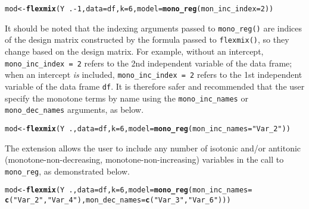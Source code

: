 \documentclass[10pt]{olplainarticle}\usepackage[]{graphicx}\usepackage[]{color}
\makeatletter
\newcommand{\hlnum}[1]{\textcolor[rgb]{0.686,0.059,0.569}{#1}}%
\newcommand{\hlstr}[1]{\textcolor[rgb]{0.192,0.494,0.8}{#1}}%
\newcommand{\hlopt}[1]{\textcolor[rgb]{0,0,0}{#1}}%
\newcommand{\hlstd}[1]{\textcolor[rgb]{0.345,0.345,0.345}{#1}}%
\newcommand{\hlkwb}[1]{\textcolor[rgb]{0.69,0.353,0.396}{#1}}%
\newcommand{\hlkwc}[1]{\textcolor[rgb]{0.333,0.667,0.333}{#1}}%
\newcommand{\hlkwd}[1]{\textcolor[rgb]{0.737,0.353,0.396}{\textbf{#1}}}%
\newenvironment{kframe}{%
 \def\at@end@of@kframe{}%
 \ifinner\ifhmode%
  \def\at@end@of@kframe{\end{minipage}}%
  \begin{minipage}{\columnwidth}%
 \fi\fi%
 \def\FrameCommand##1{\hskip\@totalleftmargin \hskip-\fboxsep
 \colorbox{shadecolor}{##1}\hskip-\fboxsep
     \hskip-\linewidth \hskip-\@totalleftmargin \hskip\columnwidth}%
 \MakeFramed {\advance\hsize-\width
   \@totalleftmargin\z@ \linewidth\hsize
   \@setminipage}}%
 {\par\unskip\endMakeFramed%
 \at@end@of@kframe}
\newenvironment{knitrout}{}{} %
\makeatother
\begin{document}
\begin{appendices}
\begin{knitrout}
\color{fgcolor}\begin{kframe}
\begin{alltt}
\hlstd{mod} \hlkwb{<-} \hlkwd{flexmix}\hlstd{(Y} \hlopt{~} \hlstd{.}\hlopt{-}\hlnum{1}\hlstd{,} \hlkwc{data} \hlstd{= df,} \hlkwc{k} \hlstd{=} \hlnum{6}\hlstd{,} \hlkwc{model} \hlstd{=} \hlkwd{mono_reg}\hlstd{(}\hlkwc{mon_inc_index} \hlstd{=} \hlnum{2}\hlstd{))}
\end{alltt}
\end{kframe}
\end{knitrout}

It should be noted that the indexing arguments passed to \texttt{mono\_reg()} are indices of the design matrix constructed by the formula passed to \texttt{flexmix()}, so they change based on the design matrix. For example, without an intercept, \texttt{mono\_inc\_index = 2} refers to the 2nd independent variable of the data frame; when an intercept \emph{is} included, \texttt{mono\_inc\_index = 2} refers to the 1st independent variable of the data frame \texttt{df}. It is therefore safer and recommended that the user specify the monotone terms by name using the \texttt{mono\_inc\_names} or \texttt{mono\_dec\_names} arguments, as below.

\begin{knitrout}
\color{fgcolor}\begin{kframe}
\begin{alltt}
\hlstd{mod} \hlkwb{<-} \hlkwd{flexmix}\hlstd{(Y} \hlopt{~} \hlstd{.,} \hlkwc{data} \hlstd{= df,} \hlkwc{k} \hlstd{=} \hlnum{6}\hlstd{,} \hlkwc{model} \hlstd{=} \hlkwd{mono_reg}\hlstd{(}\hlkwc{mon_inc_names} \hlstd{=} \hlstr{"Var_2"}\hlstd{))}
\end{alltt}
\end{kframe}
\end{knitrout}

The extension allows the user to include any number of isotonic and/or antitonic (monotone-non-decreasing, monotone-non-increasing) variables in the call to \texttt{mono\_reg}, as demonstrated below.

\begin{knitrout}
\color{fgcolor}\begin{kframe}
\begin{alltt}
\hlstd{mod} \hlkwb{<-} \hlkwd{flexmix}\hlstd{(Y} \hlopt{~} \hlstd{.,} \hlkwc{data} \hlstd{= df,} \hlkwc{k} \hlstd{=} \hlnum{6}\hlstd{,} \hlkwc{model} \hlstd{=} \hlkwd{mono_reg}\hlstd{(}\hlkwc{mon_inc_names} \hlstd{=}
                \hlkwd{c}\hlstd{(}\hlstr{"Var_2"}\hlstd{,} \hlstr{"Var_4"}\hlstd{),} \hlkwc{mon_dec_names} \hlstd{=} \hlkwd{c}\hlstd{(}\hlstr{"Var_3"}\hlstd{,} \hlstr{"Var_6"}\hlstd{)))}
\end{alltt}
\end{kframe}
\end{knitrout}


\end{appendices}
\end{document}
